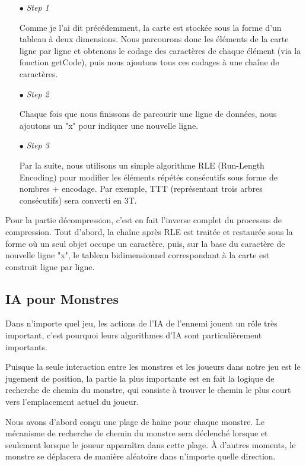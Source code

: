 \documentclass[11pt,english]{article}
\begin{document}
\small
{
\begin{itemize}
    \item [$\bullet$] \textit{Step 1}
    
    Comme je l'ai dit précédemment, la carte est stockée sous la forme d'un tableau à deux dimensions. Nous parcourons donc les éléments de la carte ligne par ligne et obtenons le codage des caractères de chaque élément (via la fonction getCode), puis nous ajoutons tous ces codages à une chaîne de caractères.

    \item [$\bullet$] \textit{Step 2}
    
    Chaque fois que nous finissons de parcourir une ligne de données, nous ajoutons un "x" pour indiquer une nouvelle ligne.

    \item [$\bullet$] \textit{Step 3}
    
    Par la suite, nous utilisons un simple algorithme RLE (Run-Length Encoding) pour modifier les éléments répétés consécutifs sous forme de nombres + encodage. Par exemple, TTT (représentant trois arbres consécutifs) sera converti en 3T.

\end{itemize}
}

\large

Pour la partie décompression, c’est en fait l’inverse complet du processus de compression. Tout d'abord, la chaîne après RLE est traitée et restaurée sous la forme où un seul objet occupe un caractère, puis, sur la base du caractère de nouvelle ligne "x", le tableau bidimensionnel correspondant à la carte est construit ligne par ligne.


\subsection{IA pour Monstres}

\indent 

Dans n'importe quel jeu, les actions de l'IA de l'ennemi jouent un rôle très important, c'est pourquoi leurs algorithmes d'IA sont particulièrement importants.

\indent Puisque la seule interaction entre les monstres et les joueurs dans notre jeu est le jugement de position, la partie la plus importante est en fait la logique de recherche de chemin du monstre, qui consiste à trouver le chemin le plus court vers l'emplacement actuel du joueur.

\indent Nous avons d'abord conçu une plage de haine pour chaque monstre. Le mécanisme de recherche de chemin du monstre sera déclenché lorsque et seulement lorsque le joueur apparaîtra dans cette plage. À d'autres moments, le monstre se déplacera de manière aléatoire dans n'importe quelle direction.
\end{document}
